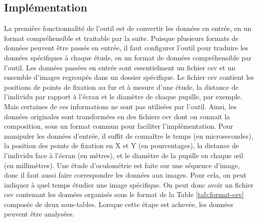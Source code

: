 \documentclass[hidelinks,12pt]{article}
\begin{document}
\subsection{Implémentation}

La première fonctionnalité de l'outil est de convertir les données en entrée,
en un format compréhensible et traitable par la suite. Puisque plusieurs
formats de données peuvent être passés en entrée, il faut configurer  l'outil
pour traduire les données spécifiques à chaque étude, en un format de données
compréhensible par l'outil. Les données passées en entrée sont essentielment un
fichier csv et un ensemble d'images regroupés dans un dossier spécifique. Le
fichier csv contient les positions de points de fixation au fur et à mesure
d'une étude, la distance de l'individu par rapport à l'écran et le diamètre de
chaque pupille, par exemple. Mais certaines de ces informations ne sont pas
utilisées par l'outil. Ainsi, les données originales sont transformées en des
fichiers csv dont on connait la composition, sous un format commun pour
faciliter l'implémentation. Pour manipuler les données d'entrée, il suffit de
connaître le temps (en microsecondes), la position des points de fixation en X
et Y (en pourcentages), la distance de l'individu face à l'écran (en mètres),
et le diamètre de la pupille en chaque œil (en millimètres). Une étude
d'oculométrie est faite sur une séquence d'image, donc il faut aussi faire
correspondre les données aux images. Pour cela, on peut indiquer à quel temps
étudier une image spécifique. On peut donc avoir un fichier csv contenant les
données organisés sous le format de la Table \ref{tab:format-csv} composée de
deux sous-tables. Lorsque cette étape est achevée, les données peuvent être
analysées.
\end{document}
